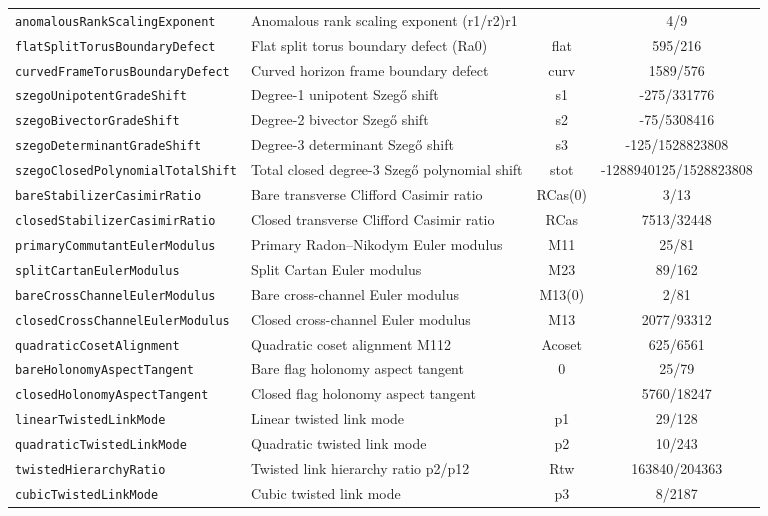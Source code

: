 \documentclass[11pt,reqno]{amsart}
\theoremstyle{definition}
\theoremstyle{remark}
\begin{document}
\begin{table}[htbp]
\begin{tabular}{@{}llcc@{}}
\texttt{anomalousRankScalingExponent} & Anomalous rank scaling exponent (r1/r2)r1 &  & 4/9 \\
\texttt{flatSplitTorusBoundaryDefect} & Flat split torus boundary defect (Ra0) & flat & 595/216 \\
\texttt{curvedFrameTorusBoundaryDefect} & Curved horizon frame boundary defect & curv & 1589/576 \\
\texttt{szegoUnipotentGradeShift} & Degree-1 unipotent Szeg\H{o} shift & s1 & -275/331776 \\
\texttt{szegoBivectorGradeShift} & Degree-2 bivector Szeg\H{o} shift & s2 & -75/5308416 \\
\texttt{szegoDeterminantGradeShift} & Degree-3 determinant Szeg\H{o} shift & s3 & -125/1528823808 \\
\texttt{szegoClosedPolynomialTotalShift} & Total closed degree-3 Szeg\H{o} polynomial shift & stot & -1288940125/1528823808 \\
\texttt{bareStabilizerCasimirRatio} & Bare transverse Clifford Casimir ratio & RCas(0) & 3/13 \\
\texttt{closedStabilizerCasimirRatio} & Closed transverse Clifford Casimir ratio & RCas & 7513/32448 \\
\texttt{primaryCommutantEulerModulus} & Primary Radon--Nikodym Euler modulus & M11 & 25/81 \\
\texttt{splitCartanEulerModulus} & Split Cartan Euler modulus & M23 & 89/162 \\
\texttt{bareCrossChannelEulerModulus} & Bare cross-channel Euler modulus & M13(0) & 2/81 \\
\texttt{closedCrossChannelEulerModulus} & Closed cross-channel Euler modulus & M13 & 2077/93312 \\
\texttt{quadraticCosetAlignment} & Quadratic coset alignment M112 & Acoset & 625/6561 \\
\texttt{bareHolonomyAspectTangent} & Bare flag holonomy aspect tangent & 0 & 25/79 \\
\texttt{closedHolonomyAspectTangent} & Closed flag holonomy aspect tangent &  & 5760/18247 \\
\texttt{linearTwistedLinkMode} & Linear twisted link mode & p1 & 29/128 \\
\texttt{quadraticTwistedLinkMode} & Quadratic twisted link mode & p2 & 10/243 \\
\texttt{twistedHierarchyRatio} & Twisted link hierarchy ratio p2/p12 & Rtw & 163840/204363 \\
\texttt{cubicTwistedLinkMode} & Cubic twisted link mode & p3 & 8/2187 \\

\end{tabular}
\end{table}
\end{document}
